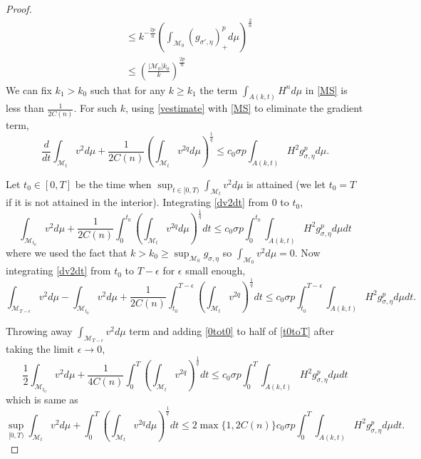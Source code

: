 \begin{proof}
\begin{align*}
            & \le k^{-\frac{2p}{n}} \left( \int_{\mathcal{M}_{0}} (g_{\sigma',\eta})_{+}^{p} d \mu\right)^{\frac{2}{n}} \\
            & \le \left( \frac{|\mathcal{M}_{0}|k_{0}}{k} \right)^{\frac{2p}{n}}
        \end{align*}
        We can fix $ k_{1} > k_{0} $ such that for any $ k \ge k_{1} $ the term $ \int_{A(k,t)}H^{n}d \mu $  in \cref{MS} is less than $ \frac{1}{2C(n)} $. For such $ k $, using \cref{vestimate} with \cref{MS} to eliminate the gradient term, 
        \begin{equation}
            \frac{d}{dt}\int_{\mathcal{M}_{t}} v^{2}d \mu + \frac{1}{2C(n)}\left( \int_{\mathcal{M}_{t}}v^{2q}d \mu \right)^{\frac{1}{q}} \le c_{0} \sigma p \int_{A(k,t)} H^{2}g_{\sigma, \eta}^{p} d \mu \label{dv2dt}.
        \end{equation}

        Let $ t_{0} \in [0,T] $ be the time when $ \sup_{t \in [0,T)} \int_{\mathcal{M}_{t}} v^{2} d \mu $ is attained (we let $ t_{0}=T $ if it is not attained in the interior). Integrating \cref{dv2dt} from $ 0 $ to $ t_{0} $, \begin{equation}
            \int_{\mathcal{M}_{t_{0}}} v^{2}d \mu+ \frac{1}{2C(n)} \int_{0}^{t_{0}} \left( \int_{\mathcal{M}_{t}}v^{2q} d \mu\right)^{\frac{1}{q}}dt \le c_{0} \sigma p \int_{0}^{t_{0}} \int_{A(k,t)}H^{2}g_{\sigma,\eta}^{p}d \mu dt \label{0tot0}
        \end{equation}
        where we used the fact that $ k>k_{0} \ge \sup_{\mathcal{M}_{0}}g_{\sigma,\eta} $ so $ \int_{\mathcal{M}_{0}}v^{2}d \mu = 0 $. Now integrating \cref{dv2dt} from $ t_{0} $ to $ T - \epsilon$ for $ \epsilon $ small enough, \begin{equation}
            \int_{\mathcal{M}_{T-\epsilon}}v^{2}d \mu - \int_{\mathcal{M}_{t_{0}}} v^{2}d \mu + \frac{1}{2C(n)} \int_{t_{0}}^{T-\epsilon} \left( \int_{\mathcal{M}_{t}}v^{2q} \right)^{\frac{1}{q}} dt \le c_{0}\sigma p \int_{t_{0}}^{T-\epsilon} \int_{A(k,t)} H^{2}g_{\sigma,\eta}^{p} d \mu dt \label{t0toT}.
        \end{equation}

        Throwing away $ \int_{\mathcal{M}_{T-\epsilon}}v^{2}d \mu $ term and adding \cref{0tot0} to half of \cref{t0toT} after taking the limit $ \epsilon \to 0 $, \begin{equation*}
            \frac{1}{2} \int_{\mathcal{M}_{t_{0}}}v^{2}d \mu + \frac{1}{4C(n)}\int_{0}^{T}\left( \int_{\mathcal{M}_{t}}v^{2q} \right)^{\frac{1}{q}}dt \le c_{0} \sigma p \int_{0}^{T} \int_{A(k,t)}H^{2}g_{\sigma,\eta}^{p}d \mu dt
        \end{equation*}
        which is same as \begin{equation}
            \sup_{[0,T)} \int_{\mathcal{M}_{t}}v^{2}d \mu +  \int_{0}^{T} \left(\int_{\mathcal{M}_{t}} v^{2q}d \mu \right)^{\frac{1}{q}}dt \le 2\max\{1,2C(n)\}c_{0} \sigma p \int_{0}^{T}\int_{A(k,t)}H^{2}g_{\sigma,\eta}^{p}d \mu dt. \label{supineq}
        \end{equation}


\end{proof}
